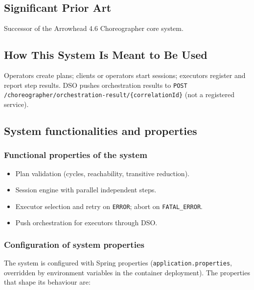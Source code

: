 \documentclass[a4paper]{arrowhead}
\begin{document}
\newpage

\subsection{Significant Prior Art}
\label{sec:prior_art}

Successor of the Arrowhead 4.6 Choreographer core system.

\subsection{How This System Is Meant to Be Used}
\label{sec:use}

Operators create plans; clients or operators start sessions; executors register and report step results. DSO pushes orchestration results to \texttt{POST /\allowbreak{}choreographer/\allowbreak{}orchestration-\allowbreak{}result/\allowbreak{}\{correlation\allowbreak{}Id\}} (not a registered service).

\subsection{System functionalities and properties}
\label{sec:properties}

\subsubsection{Functional properties of the system}

\begin{itemize}
  \item Plan validation (cycles, reachability, transitive reduction).
  \item Session engine with parallel independent steps.
  \item Executor selection and retry on \texttt{ERROR}; abort on \texttt{FATAL\_\allowbreak{}ERROR}.
  \item Push orchestration for executors through DSO.
\end{itemize}

\subsubsection{Configuration of system properties}

The system is configured with Spring properties (\texttt{application.properties}, overridden by environment variables in the container deployment). The properties that shape its behaviour are:
\end{document}
